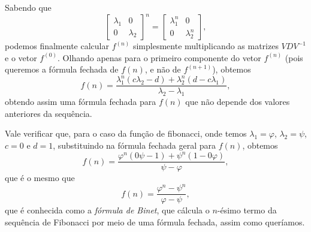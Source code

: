 Sabendo que
\[
  \begin{bmatrix}
    \lambda_1 & 0 \\
    0 & \lambda_2
  \end{bmatrix}^n
  =
  \begin{bmatrix}
    \lambda_1^n & 0 \\
    0 & \lambda_2^n
  \end{bmatrix},
\]
podemos finalmente calcular $f^{(n)}$ simplesmente multiplicando as matrizes $V D V^{-1}$ e o vetor $f^{(0)}$. Olhando apenas para o primeiro componente do vetor $f^{(n)}$ (pois queremos a fórmula fechada de $f(n)$, e não de $f^{(n+1)}$), obtemos
\[
  f(n) = \dfrac{\lambda_1^n (c \lambda_2 - d) + \lambda_2^n (d - c \lambda_1)}{\lambda_2 - \lambda_1},
\]
obtendo assim uma fórmula fechada para $f(n)$ que não depende dos valores anteriores da sequência.

Vale verificar que, para o caso da função de fibonacci, onde temos $\lambda_1 = \varphi$, $\lambda_2 = \psi$, $c=0$ e $d=1$, substituindo na fórmula fechada geral para $f(n)$, obtemos
\[
  f(n) = \dfrac{\varphi^n (0 \psi - 1) + \psi^n (1 - 0 \varphi)}{\psi - \varphi},
\]
que é o mesmo que
\[
  f(n) = \dfrac{\varphi^n - \psi^n}{\varphi - \psi},
\]
que é conhecida como a \emph{fórmula de Binet}, que cálcula o $n$-ésimo termo da sequência de Fibonacci por meio de uma fórmula fechada, assim como queríamos.
